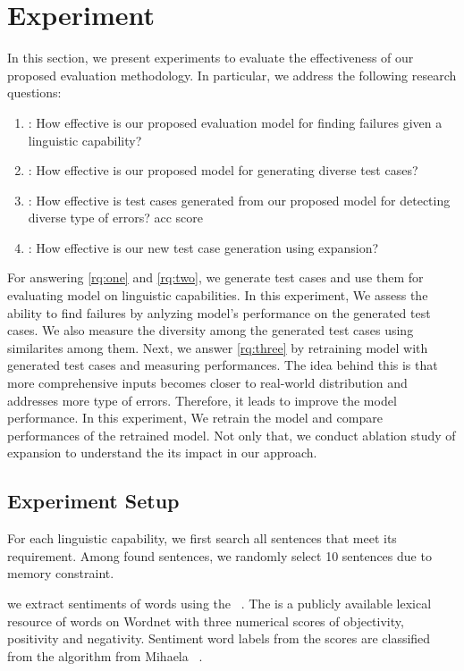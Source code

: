 \section{Experiment}
\label{sec:experiment}
%
In this section, we present experiments to evaluate the effectiveness
of our proposed evaluation methodology. In particular, we address the
following research questions:

\begin{enumerate}[label=\textbf{RQ\arabic*}]
\item \label{rq:one}: How effective is our proposed evaluation model
  for finding failures given a linguistic capability?
\item \label{rq:two}: How effective is our proposed model for
  generating diverse test cases? %
\item \label{rq:three}: How effective is test cases generated from our
  proposed model for detecting diverse type of errors? %
  acc score
\item \label{rq:four}: How effective is our new test case generation
  using \cfg expansion? %
\end{enumerate}

For answering \ref{rq:one} and \ref{rq:two}, we generate test cases
and use them for evaluating model on linguistic capabilities. In this
experiment, We assess the ability to find failures by anlyzing model's
performance on the generated test cases. We also measure the diversity
among the generated test cases using similarites among them. Next, we
answer \ref{rq:three} by retraining \sa model with generated test
cases and measuring performances. The idea behind this is that more
comprehensive inputs becomes closer to real-world distribution and
addresses more type of errors.  Therefore, it leads to improve the
model performance. In this experiment, We retrain the model and
compare performances of the retrained model. Not only that, we conduct
ablation study of \cfg expansion to understand the its impact in our
approach.

\subsection{Experiment Setup}
%
%
For each linguistic capability, we first search all sentences that
meet its requirement. Among found sentences, we randomly select 10
sentences due to memory constraint.

%
we extract sentiments of words using the
\Swn~\cite{baccianella2010sentiwordnet}. The \Swn is a publicly
available lexical resource of words on Wordnet with three numerical
scores of objectivity, positivity and negativity. Sentiment word
labels from the scores are classified from the algorithm from Mihaela
\etal~\cite{mihaela2017sentiwordnetlabel}.

